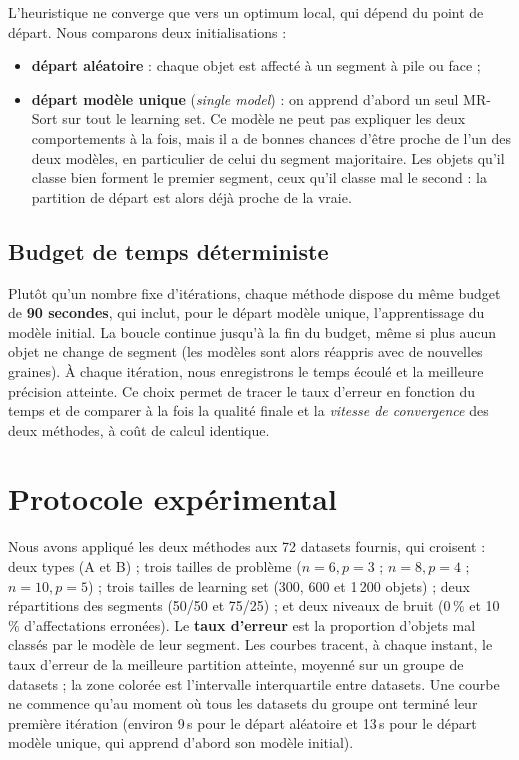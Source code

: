 \documentclass[11pt,a4paper]{article}
\begin{document}
L'heuristique ne converge que vers un optimum local, qui dépend du point de départ. Nous comparons deux
initialisations :
\begin{itemize}
  \item \textbf{départ aléatoire} : chaque objet est affecté à un segment à pile ou face ;
  \item \textbf{départ modèle unique} (\emph{single model}) : on apprend d'abord un seul MR-Sort sur tout le
        learning set. Ce modèle ne peut pas expliquer les deux comportements à la fois, mais il a de bonnes
        chances d'être proche de l'un des deux modèles, en particulier de celui du segment majoritaire. Les objets
        qu'il classe bien forment le premier segment, ceux qu'il classe mal le second : la partition de départ
        est alors déjà proche de la vraie.
\end{itemize}

\subsection{Budget de temps déterministe}

Plutôt qu'un nombre fixe d'itérations, chaque méthode dispose du même budget de \textbf{90 secondes}, qui inclut,
pour le départ modèle unique, l'apprentissage du modèle initial. La boucle continue jusqu'à la fin du budget,
même si plus aucun objet ne change de segment (les modèles sont alors réappris avec de nouvelles graines). À
chaque itération, nous enregistrons le temps écoulé et la meilleure précision atteinte. Ce choix permet de
tracer le taux d'erreur en fonction du temps et de comparer à la fois la qualité finale et la \emph{vitesse de
convergence} des deux méthodes, à coût de calcul identique.

\section{Protocole expérimental}

Nous avons appliqué les deux méthodes aux 72 datasets fournis, qui croisent :
deux types (A et B) ; trois tailles de problème ($n=6,p=3$ ; $n=8,p=4$ ; $n=10,p=5$) ; trois tailles de
learning set (300, 600 et 1\,200 objets) ; deux répartitions des segments (50/50 et 75/25) ; et deux niveaux de
bruit (0\,\% et 10\,\% d'affectations erronées). Le \textbf{taux d'erreur} est la proportion d'objets mal
classés par le modèle de leur segment. Les courbes tracent, à chaque instant, le taux d'erreur de la meilleure
partition atteinte, moyenné sur un groupe de datasets ; la zone colorée est l'intervalle interquartile entre
datasets. Une courbe ne commence qu'au moment où tous les datasets du groupe ont terminé leur première
itération (environ 9\,s pour le départ aléatoire et 13\,s pour le départ modèle unique, qui apprend d'abord son
modèle initial).
\end{document}
